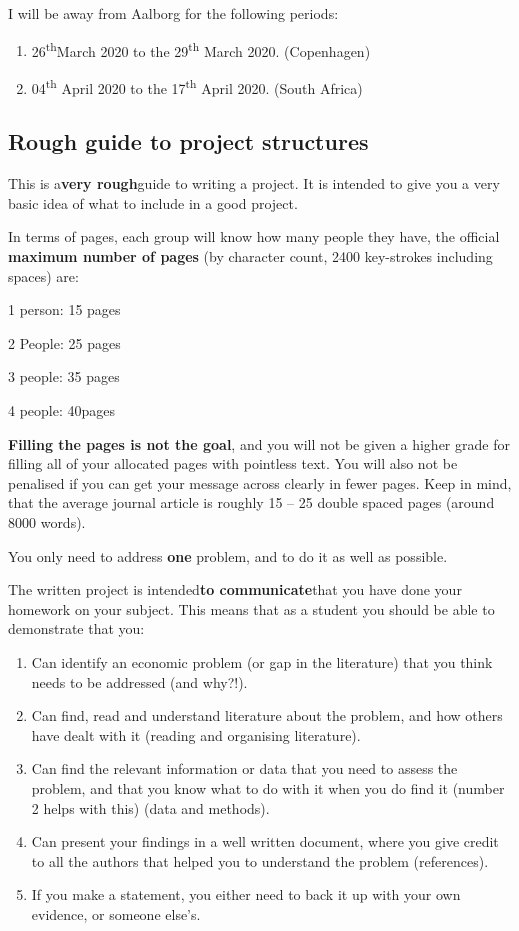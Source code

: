 \documentclass[10pt,twoside]{article}
\begin{document}
I will be away from Aalborg for the following periods:

\begin{enumerate}
\def\labelenumi{\arabic{enumi}.}
\item
  26\textsuperscript{th}March 2020 to the 29\textsuperscript{th} March
  2020. (Copenhagen)
\item
  04\textsuperscript{th} April 2020 to the 17\textsuperscript{th} April
  2020. (South Africa)
\end{enumerate}

\hypertarget{rough-guide-to-project-structures}{%
\subsection{Rough guide to project
structures}\label{rough-guide-to-project-structures}}

This is a\textbf{very rough}guide to writing a project. It is intended
to give you a very basic idea of what to include in a good project.

In terms of pages, each group will know how many people they have, the
official \textbf{maximum number of pages} (by character count, 2400
key-strokes including spaces) are:

1 person: 15 pages

2 People: 25 pages

3 people: 35 pages

4 people: 40pages

\textbf{Filling the pages is not the goal}, and you will not be given a
higher grade for filling all of your allocated pages with pointless
text. You will also not be penalised if you can get your message across
clearly in fewer pages. Keep in mind, that the average journal article
is roughly 15 -- 25 double spaced pages (around 8000 words).

You only need to address \textbf{one} problem, and to do it as well as
possible.

The written project is intended\textbf{to communicate}that you have done
your homework on your subject. This means that as a student you should
be able to demonstrate that you:

\begin{enumerate}
\def\labelenumi{\arabic{enumi}.}
\item
  Can identify an economic problem (or gap in the literature) that you
  think needs to be addressed (and why?!).
\item
  Can find, read and understand literature about the problem, and how
  others have dealt with it (reading and organising literature).
\item
  Can find the relevant information or data that you need to assess the
  problem, and that you know what to do with it when you do find it
  (number 2 helps with this) (data and methods).
\item
  Can present your findings in a well written document, where you give
  credit to all the authors that helped you to understand the problem
  (references).
\item
  If you make a statement, you either need to back it up with your own
  evidence, or someone else's.
\end{enumerate}
\end{document}

